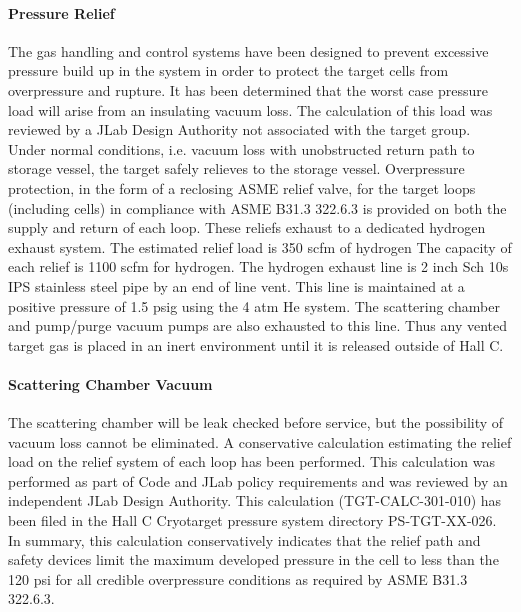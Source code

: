 \paragraph{Pressure Relief}

The gas handling and control systems have been designed to prevent
excessive pressure build up in the system in order to protect the
target cells from overpressure and rupture. It has been determined
that the worst case pressure load will arise from an insulating vacuum
loss. The calculation of this load was reviewed by a JLab Design
Authority not associated with the target group. Under normal
conditions, i.e. vacuum loss with unobstructed return path to storage
vessel, the target safely relieves to the storage vessel.
Overpressure protection, in the form of a reclosing ASME relief valve,
for the target loops (including cells) in compliance with ASME B31.3
322.6.3 is provided on both the supply and return of each loop. These
reliefs exhaust to a dedicated hydrogen exhaust system. The estimated
relief load is 350 scfm of hydrogen The capacity of each relief is
1100 scfm for hydrogen.  The hydrogen exhaust line is 2 inch Sch 10s
IPS stainless steel pipe %
by an end of line vent. This line is maintained at a positive pressure
of 1.5 psig using the 4 atm He system.  The scattering chamber and
pump/purge vacuum pumps are also exhausted to this line. Thus any
vented target gas is placed in an inert environment until it is
released outside of Hall C.


\paragraph{Scattering Chamber Vacuum}

\label{sec:cryo_targ_cmb_falure}

The scattering chamber will be leak checked before service, but the
possibility of vacuum loss cannot be eliminated. A conservative calculation
estimating the relief load on the relief system of each loop has been
performed. This calculation was performed as part of Code and JLab
policy requirements and was reviewed by an independent JLab Design
Authority. This calculation (TGT-CALC-301-010) has been filed in the
Hall C Cryotarget pressure system directory PS-TGT-XX-026. In summary,
this calculation conservatively indicates that the relief path and
safety devices limit the maximum developed pressure in the cell to
less than the 120 psi for all credible overpressure conditions as
required by ASME B31.3 322.6.3.

